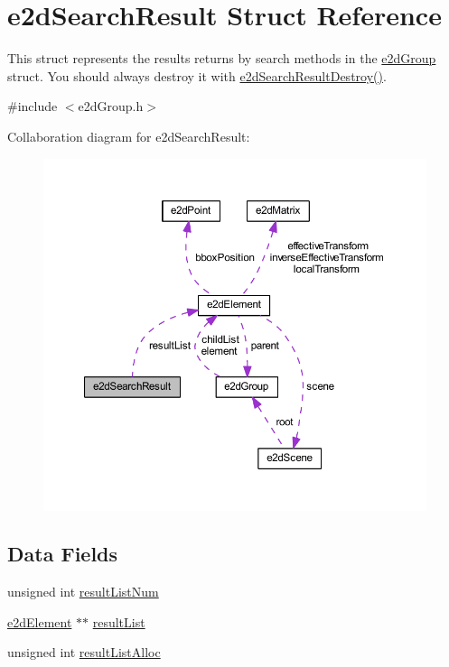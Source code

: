 \hypertarget{structe2dSearchResult}{\section{e2d\-Search\-Result Struct Reference}
\label{structe2dSearchResult}
}


This struct represents the results returns by search methods in the \hyperlink{structe2dGroup}{e2d\-Group} struct. You should always destroy it with \hyperlink{group__e2dGroup_ga0775c9a7e2ec5311263f84339afb52bc}{e2d\-Search\-Result\-Destroy()}.  




{\ttfamily \#include $<$e2d\-Group.\-h$>$}



Collaboration diagram for e2d\-Search\-Result\-:
\nopagebreak
\begin{figure}[H]
\begin{center}
\leavevmode
\includegraphics[width=350pt]{structe2dSearchResult__coll__graph}
\end{center}
\end{figure}
\subsection*{Data Fields}
\begin{DoxyCompactItemize}
\item 
unsigned int \hyperlink{structe2dSearchResult_a65874957dc9197a16158b3807acb5d1e}{result\-List\-Num}
\item 
\hyperlink{structe2dElement}{e2d\-Element} $\ast$$\ast$ \hyperlink{structe2dSearchResult_acb54f0ae39cc6710460aa41f5f0afd9f}{result\-List}
\item 
unsigned int \hyperlink{structe2dSearchResult_a0b7370bba258bd87e0d7ae10af711d34}{result\-List\-Alloc}
\end{DoxyCompactItemize}


